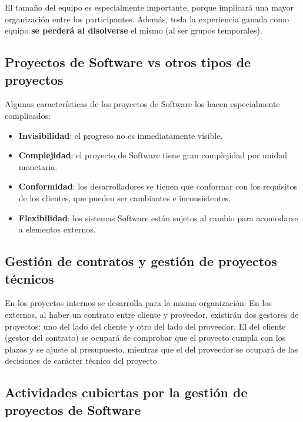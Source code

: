 \documentclass[12pt]{article}
\begin{document}
{El tamaño del equipo es especialmente importante, porque implicará una mayor organización entre los participantes. Además, toda la experiencia ganada como equipo \textbf{se perderá al disolverse} el mismo (al ser grupos temporales).}

\subsection[Proyectos de Software vs otros tipos de proyectos]{Proyectos de Software vs otros tipos de \\proyectos}
\label{1.4.0}

{Algunas características de los proyectos de Software los hacen especialmente complicados:}

\begin{itemize}
    \item {\textbf{Invisibilidad}: el progreso no es inmediatamente visible.}
    \item {\textbf{Complejidad}: el proyecto de Software tiene gran complejidad por unidad monetaria.}
    \item {\textbf{Conformidad}: los desarrolladores se tienen que conformar con los requisitos de los clientes, que pueden ser cambiantes e inconsistentes.}
    \item {\textbf{Flexibilidad}: los sistemas Software están sujetos al cambio para acomodarse a elementos externos.}
\end{itemize}

\subsection[Gestión de contratos y gestión de proyectos técnicos]{Gestión de contratos y gestión de proyectos \\técnicos}
\label{1.5.0}

{En los proyectos internos se desarrolla para la misma organización. En los externos, al haber un contrato entre cliente y proveedor, existirán dos gestores de proyectos: uno del lado del cliente y otro del lado del proveedor. El del cliente (gestor del contrato) se ocupará de comprobar que el proyecto cumpla con los plazos y se ajuste al presupuesto, mientras que el del proveedor se ocupará de las decisiones de carácter técnico del proyecto.}

\subsection[Actividades cubiertas por la gestión de proyectos de Software]{Actividades cubiertas por la gestión de \\proyectos de Software}
\label{1.6.0}
\end{document}
